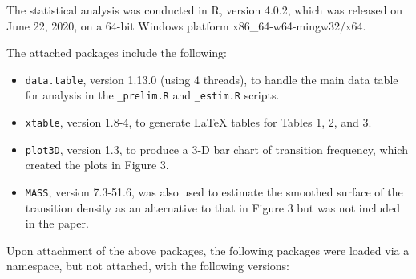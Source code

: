 \documentclass[11pt]{paper}
\begin{document}
The statistical analysis was conducted in R, version 4.0.2,
which was released on June 22, 2020, 
on a 64-bit Windows platform x86\_64-w64-mingw32/x64. 

The attached packages include the following:

\begin{itemize}

\item \texttt{data.table}, version 1.13.0 (using 4 threads), to handle the main data table for analysis 
in the \texttt{\_prelim.R} and \texttt{\_estim.R} scripts. 

\item \texttt{xtable}, version 1.8-4, to generate LaTeX tables for Tables 1, 2, and 3.

\item \texttt{plot3D}, version 1.3, to produce a 3-D bar chart of transition frequency, which created the plots in Figure 3.

\item \texttt{MASS}, version 7.3-51.6, was also used to estimate the smoothed surface of the transition density as an alternative to that in Figure 3 but was not included in the paper. 

\end{itemize}

Upon attachment of the above packages, 
the following packages were loaded via a namespace, but not attached,
with the following versions:
\end{document}
